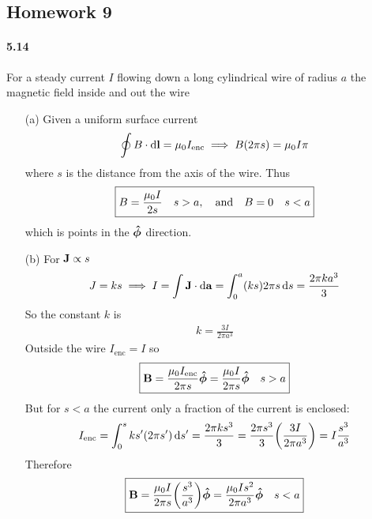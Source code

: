 \documentclass[../main.tex]{subfiles}
\begin{document}
\pagestyle{fancy}

\begin{center}
    \section*{Homework 9}
\end{center}

\paragraph{5.14} For a steady current $I$ flowing down a long cylindrical wire of radius $a$ the magnetic field inside and out the wire
\begin{itemize}
    \item [(a)] Given a uniform surface current
    \begin{align*}
        \oint B \cdot \dd{\vb l} = \mu_0 I_\text{enc} \implies B(2\pi s) = \mu_0 I \pi 
    \end{align*}
    where $s$ is the distance from the axis of the wire. Thus
    \begin{align*}
        \boxed{
            B = \frac{\mu_0 I}{2s} \quad s > a, \qand B = 0 \quad s < a
        }
    \end{align*}
    which is points in the $\vu*\phi$ direction.
    \item [(b)] For $\vb J \propto s$
    \begin{align*}
        J = ks \implies I = \int \vb J \cdot \dd{\vb a} = \int_0^a (ks) 2\pi s \dd{s}  = \frac{2\pi k a^3}{3}
    \end{align*}
    So the constant $k$ is
    \begin{align*}
        k = \frac{3I}{2\pi a^3}
    \end{align*}
    Outside the wire $I_\text{enc} = I$ so
    \begin{align*}
        \boxed{
            \vb{B} = \frac{\mu_0 I_\text{enc}}{2\pi s} \vu*\phi =  \frac{\mu_0 I}{2\pi s} \vu*\phi \quad s > a
        }
    \end{align*}
    But for $s < a$ the current only a fraction of the current is enclosed:
    \begin{align*}
        I_\text{enc} = \int_0^s ks' (2\pi s') \dd{s'} = \frac{2\pi k s^3}{3} = \frac{2\pi s^3}{3} \qt(\frac{3I}{2\pi a^3}) = I \frac{s^3}{a^3}
    \end{align*}
    Therefore
    \begin{align*}
        \boxed{
            \vb B = \frac{\mu_0 I}{2\pi s} \qt(\frac{s^3}{a^3}) \vu*\phi = \frac{\mu_0 I s^2}{2\pi a^3} \vu*\phi \quad s < a
        }
    \end{align*}
\end{itemize}
\end{document}
